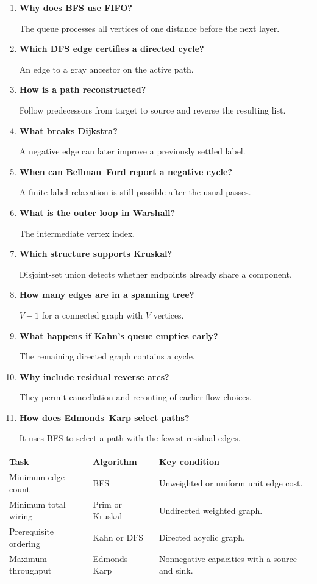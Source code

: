 \documentclass[12pt,a4paper]{article}
\newcommand{\Q}[1]{\textbf{#1}\par\noindent\ignorespaces}
\begin{document}
\begin{tcolorbox}[exambox, title={Frequently Asked / Viva Questions}]
\begin{enumerate}[topsep=0pt, label=\textbf{Q\arabic*.}, itemsep=5pt, leftmargin=*]
  \item \Q{Why does BFS use FIFO?}
    The queue processes all vertices of one distance before the next layer.
  \item \Q{Which DFS edge certifies a directed cycle?}
    An edge to a gray ancestor on the active path.
  \item \Q{How is a path reconstructed?}
    Follow predecessors from target to source and reverse the resulting list.
  \item \Q{What breaks Dijkstra?}
    A negative edge can later improve a previously settled label.
  \item \Q{When can Bellman--Ford report a negative cycle?}
    A finite-label relaxation is still possible after the usual passes.
  \item \Q{What is the outer loop in Warshall?}
    The intermediate vertex index.
  \item \Q{Which structure supports Kruskal?}
    Disjoint-set union detects whether endpoints already share a component.
  \item \Q{How many edges are in a spanning tree?}
    $V-1$ for a connected graph with $V$ vertices.
  \item \Q{What happens if Kahn's queue empties early?}
    The remaining directed graph contains a cycle.
  \item \Q{Why include residual reverse arcs?}
    They permit cancellation and rerouting of earlier flow choices.
  \item \Q{How does Edmonds--Karp select paths?}
    It uses BFS to select a path with the fewest residual edges.
\end{enumerate}
\end{tcolorbox}

\begin{tcolorbox}[tikzbox, title={Summary Comparison}]
\par\vspace{5pt}
\begingroup
\setlength{\extrarowheight}{1pt}
\noindent\begin{tabularx}{\linewidth}{|B{3.45cm}|Y|Y|}
\hline
\textbf{Task} & \textbf{Algorithm} & \textbf{Key condition} \\ \hline
Minimum edge count & BFS & Unweighted or uniform unit edge cost. \\ \hline
Minimum total wiring & Prim or Kruskal & Undirected weighted graph. \\ \hline
Prerequisite ordering & Kahn or DFS & Directed acyclic graph. \\ \hline
Maximum throughput & Edmonds--Karp & Nonnegative capacities with a source and sink. \\ \hline
\end{tabularx}\par
\endgroup
\end{tcolorbox}
\end{document}
